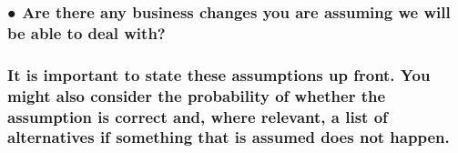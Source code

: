 \documentclass[
]{article}
\begin{document}
\hypertarget{are-there-any-business-changes-you-are-assuming-we-will-be-able-to-deal-with}{%
\subsubsection{\texorpdfstring{● Are there any business changes you are
assuming we will be able to deal with?
}{● Are there any business changes you are assuming we will be able to deal with? }}\label{are-there-any-business-changes-you-are-assuming-we-will-be-able-to-deal-with}}

\hypertarget{it-is-important-to-state-these-assumptions-up-front.-you-might-also-consider-the-probability-of-whether-the-assumption-is-correct-and-where-relevant-a-list-of-alternatives-if-something-that-is-assumed-does-not-happen.}{%
\subsubsection{\texorpdfstring{It is important to state these
assumptions up front. You might also consider the probability of whether
the assumption is correct and, where relevant, a list of alternatives if
something that is assumed does not happen.
}{It is important to state these assumptions up front. You might also consider the probability of whether the assumption is correct and, where relevant, a list of alternatives if something that is assumed does not happen. }}\label{it-is-important-to-state-these-assumptions-up-front.-you-might-also-consider-the-probability-of-whether-the-assumption-is-correct-and-where-relevant-a-list-of-alternatives-if-something-that-is-assumed-does-not-happen.}}
\end{document}
